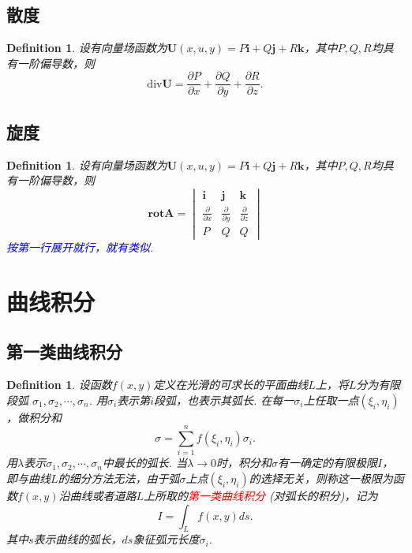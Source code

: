 \documentclass{article}
\newcommand{\mbf}[1]{\bm{#1}}
\newtheorem{definition}[theorem]{Definition}
\newcommand{\redt}[1]{\textcolor{red}{#1}}
\newcommand{\bluet}[1]{\textcolor{blue}{#1}}
\begin{document}
\subsection{散度}

\begin{definition}
\rm 设有向量场函数为$\mbf{U}(x,u,y)=P\mbf{i}+Q\mbf{j}+R\mbf{k}$，其中$P,Q,R$均具有一阶偏导数，则
$$
\text{div} \mbf{U} = \frac{\partial P}{\partial x} + \frac{\partial Q}{\partial y} + \frac{\partial R}{\partial z}.
$$
\end{definition}

\subsection{旋度}

\begin{definition}
\rm 设有向量场函数为$\mbf{U}(x,u,y)=P\mbf{i}+Q\mbf{j}+R\mbf{k}$，其中$P,Q,R$均具有一阶偏导数，则
$$
\textbf{rot}\mbf{A} = \begin{vmatrix}
\mbf{i} & \mbf{j} & \mbf{k} \\
\frac{\partial }{\partial x} & \frac{\partial }{\partial y} & \frac{\partial }{\partial z} \\
P & Q & Q
\end{vmatrix}
$$
\bluet{按第一行展开就行，就有类似}. 
\end{definition}

\newpage
\section{曲线积分}

\subsection{第一类曲线积分}
\begin{definition}
\rm 设函数$f(x,y)$定义在光滑的可求长的平面曲线$L$上，将$L$分为有限段弧
$\sigma_1,\sigma_2,\cdots,\sigma_n$. 用$\sigma_i$表示第$i$段弧，也表示其弧长. 在每一$\sigma_i$上任取一点$(\xi_i,\eta_i)$，做积分和
$$
\sigma = \sum\limits_{i = 1}^n f(\xi_i,\eta_i)\sigma_i.
$$
用$\lambda$表示$\sigma_1,\sigma_2,\cdots,\sigma_n$中最长的弧长. 当$\lambda \to 0$时，积分和$\sigma$有一确定的有限极限$I$，即与曲线$L$的细分方法无法，由于弧$\sigma$上点$(\xi_i,\eta_i)$的选择无关，则称这一极限为函数$f(x,y)$沿曲线或者道路$L$上所取的\redt{第一类曲线积分}
(对弧长的积分)，记为
$$
I = \int_L f(x,y)ds. 
$$
其中$s$表示曲线的弧长，$ds$象征弧元长度$\sigma_i$.
\end{definition}
\end{document}
